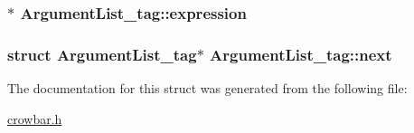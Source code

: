 \subsubsection[{expression}]{$\ast$ Argument\+List\+\_\+tag\+::expression}\label{struct_argument_list__tag_a90b0642f2ea0053d4382053fe4fb397b}
\hypertarget{struct_argument_list__tag_adf51711dee3b1c443d0f75a92c0a8d6b}{}
\subsubsection[{next}]{\setlength{\rightskip}{0pt plus 5cm}struct {\bf Argument\+List\+\_\+tag}$\ast$ Argument\+List\+\_\+tag\+::next}\label{struct_argument_list__tag_adf51711dee3b1c443d0f75a92c0a8d6b}


The documentation for this struct was generated from the following file\+:\begin{DoxyCompactItemize}
\item 
\hyperlink{crowbar_8h}{crowbar.\+h}\end{DoxyCompactItemize}
